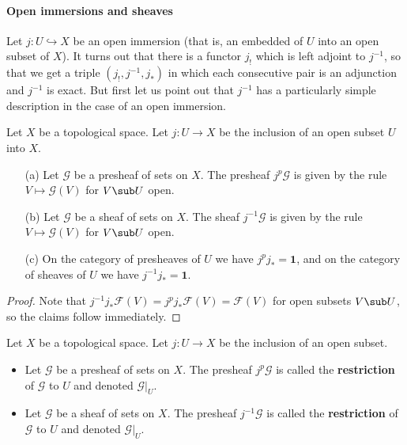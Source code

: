 \paragraph{Open immersions and sheaves}
Let $j:U\hookrightarrow X$ be an open immersion (that is, an embedded of $U$ into an open subset of $X$). It turns out that there is a functor $j_!$ which is left adjoint to $j^{-1}$, so that we get a triple $(j_!,j^{-1},j_*)$ in which each consecutive pair is an adjunction and $j^{-1}$ is exact. But first let us point out that $j^{-1}$ has a particularly simple description in the case of an open immersion.
\begin{proposition}\label{sheaf inverse image of open immersion}
Let $X$ be a topological space. Let $j:U\to X$ be the inclusion of an open subset $U$ into $X$.
\begin{itemize}
\item[(a)] Let $\mathscr{G}$ be a presheaf of sets on $X$. The presheaf $j^p\mathscr{G}$ is given by the rule $V\mapsto\mathscr{G}(V)$ for $V\sub U$ open.
\item[(b)] Let $\mathscr{G}$ be a sheaf of sets on $X$. The sheaf $j^{-1}\mathscr{G}$ is given by the rule $V\mapsto\mathscr{G}(V)$ for $V\sub U$ open.
\item[(c)] On the category of presheaves of $U$ we have $j^pj_*=\mathbf{1}$, and on the category of sheaves of $U$ we have $j^{-1}j_*=\mathbf{1}$.
\end{itemize}
\end{proposition}
\begin{proof}
Note that $j^{-1}j_*\mathscr{F}(V)=j^{p}j_*\mathscr{F}(V)=\mathscr{F}(V)$ for open subsets $V\sub U$, so the claims follow immediately.
\end{proof}
\begin{definition}
Let $X$ be a topological space. Let $j:U\to X$ be the inclusion of an open subset.
\begin{itemize}
\item Let $\mathscr{G}$ be a presheaf of sets on $X$. The presheaf $j^p\mathscr{G}$ is called the \textbf{restriction} of $\mathscr{G}$ to $U$ and denoted $\mathscr{G}|_U$.
\item Let $\mathscr{G}$ be a sheaf of sets on $X$. The presheaf $j^{-1}\mathscr{G}$ is called the \textbf{restriction} of $\mathscr{G}$ to $U$ and denoted $\mathscr{G}|_U$.
\end{itemize}
\end{definition}
